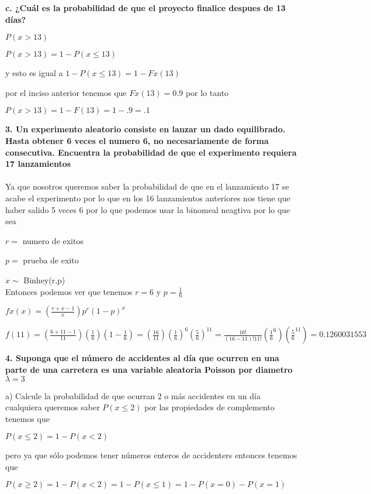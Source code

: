 \renewcommand{\labelenumi}{\alph{enumi})}

\textbf{c. ¿Cu\'al es la probabilidad de que el proyecto finalice
despues de 13 d\'ias?}

$P(x > 13)$


$P(x > 13) = 1 - P(x \leq 13)$

y esto es igual a $1 - P(x \leq 13) = 1 - Fx(13)$

por el inciso anterior tenemos que $Fx(13) = 0.9$ por lo tanto

$P(x>13) = 1-F(13)= 1 - .9 = .1$


\textbf{3. Un experimento aleatorio consiste en lanzar un dado equilibrado. 
Hasta obtener 6 veces el numero 6, no necesariamente de forma consecutiva.
Encuentra la probabilidad de que el experimento requiera 17 lanzamientos}
\\ \\
Ya que nosotros queremos saber la probabilidad de que en el lanzamiento 
17 se acabe el experimento por lo que en los 16 lanzamientos anteriores 
nos tiene que haber salido 5 veces 6 por lo que podemos usar la binomeal
neagtiva por lo que sea

$r =$ numero de exitos 

$p =$ prueba de exito

$x \sim $ Binhey(r,p)
\\
Entonces podemos ver que tenemos $r=6$ y $p= \frac{1}{6}$

$fx(x) = (\frac{r + x-1}{x})p^{r}(1-p)^{x}$

$f(11) = (\frac{6 + 11-1}{11})(\frac{1}{6})(1-\frac{1}{6}) = 
(\frac{16}{11})(\frac{1}{6})^{6}(\frac{5}{6})^{11} = \frac{16!}{(16-11)!11!}(\frac{1}{6}^{6})(\frac{5}{6}^{11})
= 0.1260031553$

\textbf{4. Suponga que el n\'umero de accidentes al d\'ia que ocurren en una 
parte de una carretera es una variable aleatoria Poisson por diametro $\lambda = 3$}

a) Calcule la probabilidad de que ocurran 2 o m\'as accidentes en un d\'ia cualquiera
queremos saber $P(x\leq 2)$ por las propiedades de complemento tenemos que

$P(x \leq 2)=1 -P(x<2)$

pero ya que s\'olo podemos tener n\'umeros enteros de accidenters entonces tenemos que

$P(x \geq 2)= 1-P(x<2)=1-P(x \leq 1)=1-P(x=0)-P(x=1)$

